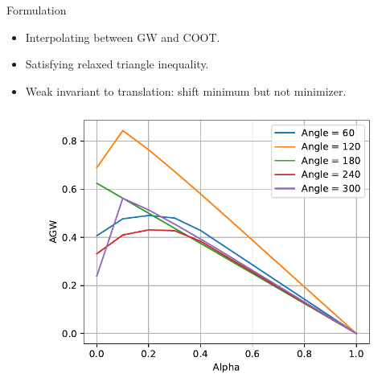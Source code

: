 \documentclass{beamer}
\begin{document}
\begin{frame}{Formulation}
\begin{minipage}[t]{0.6\linewidth}
  \begin{itemize}
    \item Interpolating between GW and COOT.
    \item Satisfying relaxed triangle inequality.
    \item Weak invariant to translation: shift minimum but not minimizer.
  \end{itemize}
  \end{minipage}%
  \hfill%
  \hspace{-6cm}
  \begin{minipage}[t]{0.4\linewidth}
    \vspace{-0.2cm}
  \begin{figure}
    \centering
    \includegraphics[width=1.1\linewidth, keepaspectratio=true]{OT_new/agw_alpha.pdf}
  \end{figure}
  \end{minipage}

\end{frame}
\end{document}
